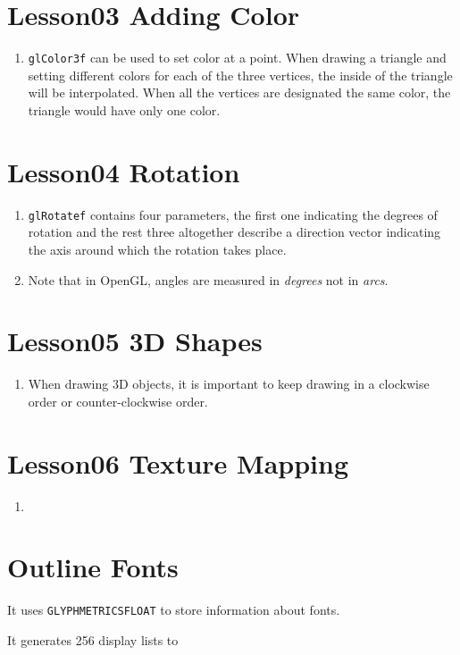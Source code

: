 \section{Lesson03 Adding Color}
\begin{enumerate}
	\item \verb|glColor3f| can be used to set color at a point. When drawing a triangle and setting different colors for each of the three vertices, the inside of the triangle will be interpolated. When all the vertices are designated the same color, the triangle would have only one color.
\end{enumerate}

\section{Lesson04 Rotation}
\begin{enumerate}
	\item \verb|glRotatef| contains four parameters, the first one indicating the degrees of rotation and the rest three altogether describe a direction vector indicating the axis around which the rotation takes place.
	\item Note that in OpenGL, angles are measured in \emph{degrees} not in \emph{arcs}.
\end{enumerate}

\section{Lesson05 3D Shapes}
\begin{enumerate}
	\item When drawing 3D objects, it is important to keep drawing in a clockwise order or counter-clockwise order.
\end{enumerate}

\section{Lesson06 Texture Mapping}
\begin{enumerate}
	\item 
\end{enumerate}

\section{Outline Fonts}

It uses \verb|GLYPHMETRICSFLOAT| to store information about fonts.

It generates 256 display lists to 


